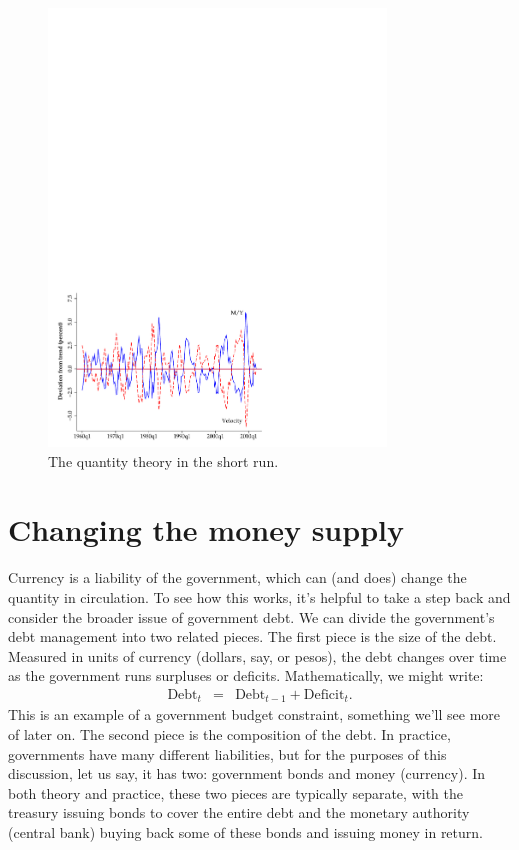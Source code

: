 \begin{figure}[h]
    \caption{The quantity theory in the short run.}
    \label{fig:quantity_short}
    \centering
    \includegraphics[width=0.8\textwidth]{Figures/short_1.pdf}
\end{figure}


\section{Changing the money supply}

Currency is a liability of the government,
which can (and does) change the quantity in circulation.
To see how this works, it's helpful to take a
step back and consider the broader issue of government debt.
We can divide the government's debt management into two
related pieces.
The first piece is the size of the debt.
Measured in units of currency (dollars, say, or pesos),
the debt changes over time as the government runs surpluses
or deficits.
Mathematically, we might write:
\begin{eqnarray*}
    \mbox{Debt}_{t} &=& \mbox{Debt}_{t-1} + \mbox{Deficit}_t .
\end{eqnarray*}
This is an example of a government budget constraint, something
we'll see more of later on.
The second piece is the composition of the debt.
In practice, governments have many different liabilities,
but for the purposes of this discussion, let us say, it has two:
government bonds and money (currency).
In both theory and practice,
these two pieces are typically separate,
with the treasury issuing bonds to cover the entire debt
and the monetary authority (central bank) buying back
some of these bonds and issuing money in return.

